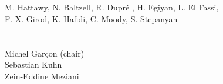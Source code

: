 \begin{titlepage}
  {%

   \vspace*{+3.0cm}
   \begin{center}
    \\
   \vspace*{+1.5cm} \\
   \vspace*{0.15cm}
   \noindent \fontsize{14}{19}\selectfont M. Hattawy, N. Baltzell, R. Dupr\'e , 
H. Egiyan, L. El Fassi,\\ F.-X. Girod, K. Hafidi, C. Moody, S. Stepanyan\\
   \vspace*{0.15cm}
    \\    
   \vspace{+0.8cm}
    \\ 
   \vspace{+0.2cm}
    Michel Gar\c{c}on (chair)\\
    Sebastian Kuhn \\
    Zein-Eddine Meziani       
      
     \end{center}

  }

  \newpage
  \thispagestyle{plain}


\end{titlepage}
\sloppy

\titlepage
